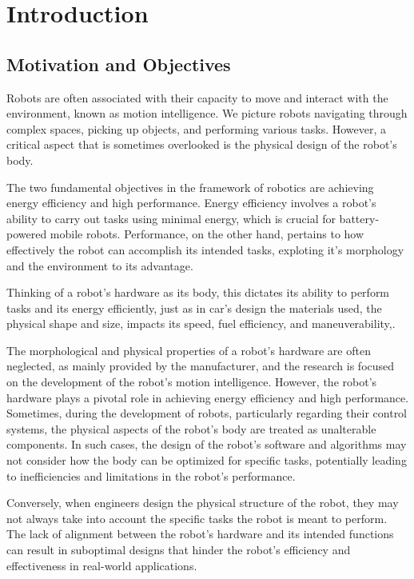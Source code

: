 \label{chp:001-Introduction}

\chapter{Introduction}

\section{Motivation and Objectives}

Robots are often associated with their capacity to move and interact with the environment, known as motion intelligence. We picture robots navigating through complex spaces, picking up objects, and performing various tasks. However, a critical aspect that is sometimes overlooked is the physical design of the robot's body.

The two fundamental objectives in the framework of robotics are achieving energy efficiency and high performance. Energy efficiency involves a robot's ability to carry out tasks using minimal energy, which is crucial for battery-powered mobile robots. Performance, on the other hand, pertains to how effectively the robot can accomplish its intended tasks, exploting it's morphology and the environment to its advantage.

Thinking of a robot's hardware as its body, this dictates its ability to perform tasks and its energy efficiently, just as in car's design the materials used, the physical shape and size, impacts its speed, fuel efficiency, and maneuverability,.

The morphological and physical properties of a robot's hardware are often neglected, as mainly provided by the manufacturer, and the research is focused on the development of the robot's motion intelligence. However, the robot's hardware plays a pivotal role in achieving energy efficiency and high performance.
Sometimes, during the development of robots, particularly regarding their control systems, the physical aspects of the robot's body are treated as unalterable components. In such cases, the design of the robot's software and algorithms may not consider how the body can be optimized for specific tasks, potentially leading to inefficiencies and limitations in the robot's performance.

Conversely, when engineers design the physical structure of the robot, they may not always take into account the specific tasks the robot is meant to perform. The lack of alignment between the robot's hardware and its intended functions can result in suboptimal designs that hinder the robot's efficiency and effectiveness in real-world applications.

